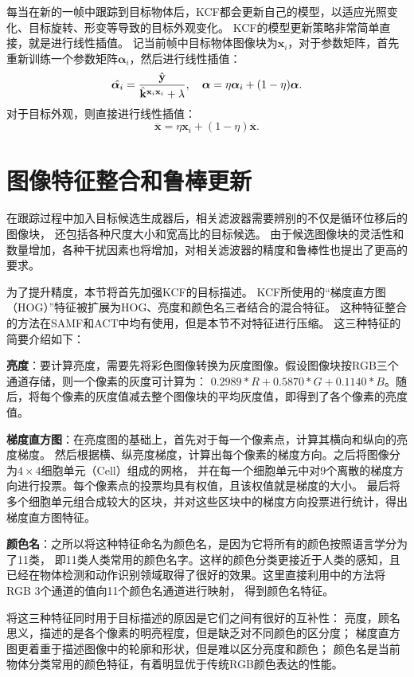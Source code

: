 每当在新的一帧中跟踪到目标物体后，KCF都会更新自己的模型，以适应光照变化、目标旋转、形变等导致的目标外观变化。
KCF的模型更新策略非常简单直接，就是进行线性插值。
记当前帧中目标物体图像块为$\mathbf{x}_i$，对于参数矩阵，首先重新训练一个参数矩阵$\boldsymbol{\alpha}_i$，然后进行线性插值：
\begin{equation}
	\hat{\boldsymbol{\alpha}_i}=\frac{\hat{\mathbf{y}}}{\hat{\mathbf{k}}{}^{\mathbf{x}_i\mathbf{x}_i}+\lambda}, \\ \ \ \ 
	\boldsymbol{\alpha}=\eta{\boldsymbol{\alpha}_i} + ( 1-\eta )\boldsymbol{\alpha}.
	\label{kcf_learning2}
\end{equation}
对于目标外观，则直接进行线性插值：
\begin{equation}
\overline{\mathbf{x}}=\eta\mathbf{x}_i+(1-\eta)\overline{\mathbf{x}}.
\label{kcf_appearlearning}
\end{equation}


\section{图像特征整合和鲁棒更新}
在跟踪过程中加入目标候选生成器后，相关滤波器需要辨别的不仅是循环位移后的图像块，
还包括各种尺度大小和宽高比的目标候选。
由于候选图像块的灵活性和数量增加，各种干扰因素也将增加，对相关滤波器的精度和鲁棒性也提出了更高的要求。

为了提升精度，本节将首先加强KCF的目标描述。
KCF所使用的``梯度直方图（HOG）''特征被扩展为HOG、亮度和颜色名三者结合的混合特征。
这种特征整合的方法在SAMF和ACT中均有使用，但是本节不对特征进行压缩。
这三种特征的简要介绍如下：
\begin{compactitem}
\item{\textbf{亮度}：要计算亮度，需要先将彩色图像转换为灰度图像。假设图像块按RGB三个通道存储，则一个像素的灰度可计算为：
$0.2989 * R + 0.5870 * G + 0.1140 * B$。随后，将每个像素的灰度值减去整个图像块的平均灰度值，即得到了各个像素的亮度值。}
\item{\textbf{梯度直方图}\upcite{hog}：在亮度图的基础上，首先对于每一个像素点，计算其横向和纵向的亮度梯度。
然后根据横、纵亮度梯度，计算出每个像素的梯度方向。之后将图像分为$4\times4$细胞单元（Cell）组成的网格，
并在每一个细胞单元中对9个离散的梯度方向进行投票。每个像素点的投票均具有权值，且该权值就是梯度的大小。
最后将多个细胞单元组合成较大的区块，并对这些区块中的梯度方向投票进行统计，得出梯度直方图特征。}
\item{\textbf{颜色名}：之所以将这种特征命名为颜色名，是因为它将所有的颜色按照语言学分为了11类，
即11类人类常用的颜色名字。这样的颜色分类更接近于人类的感知，且已经在物体检测\upcite{colornaminguse2}和动作识别领域取得了很好的效果。这里直接利用\cite{colornaming}中的方法将RGB 3个通道的值向11个颜色名通道进行映射，
得到颜色名特征。}
\end{compactitem}
将这三种特征同时用于目标描述的原因是它们之间有很好的互补性：
亮度，顾名思义，描述的是各个像素的明亮程度，但是缺乏对不同颜色的区分度；
梯度直方图更着重于描述图像中的轮廓和形状，但是难以区分亮度和颜色；
颜色名是当前物体分类常用的颜色特征，有着明显优于传统RGB颜色表达的性能。


